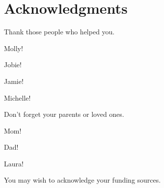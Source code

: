 
\chapter{Acknowledgments}

Thank those people who helped you. 

Molly!

Jobie!

Jamie!

Michelle!

Don't forget your parents or loved ones.

Mom!

Dad!

Laura!

You may wish to acknowledge your funding sources.
